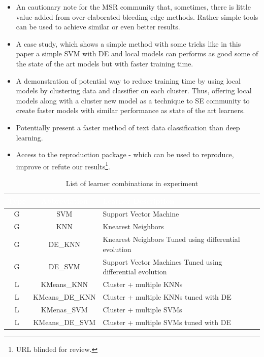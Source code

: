 \documentclass[sigconf]{acmart}
\theoremstyle{break}
\begin{document}
    \begin{itemize}
        \item An cautionary note for the MSR community
        that, sometimes, there is little value-added from
        over-elaborated bleeding edge methods. Rather simple tools  can be used to achieve similar or even better results.
        \item A case study, which shows a simple method with some tricks like in this paper a simple SVM with DE and local models can performs as good some of the state of the art models but with faster training time.
        \item A demonstration of potential way to reduce training time by using local models by clustering data and classifier on each cluster. Thus, offering local models along with a cluster new model as a technique to SE community to create faster models with similar performance as state of the art learners.
        \item Potentially present a faster method of text data classification than deep learning.
        \item Access to the reproduction package - which can be used to reproduce, improve or refute our results\footnote{URL blinded for review.}.

    \end{itemize}
    \begin{table}[!t]
        \centering
        \small
        \begin{tabular}{c|c|p{4cm}}
            \rowcolor{gray} \textcolor{white}{\textbf{Type}} & \textcolor{white}{\textbf{Abbreviation}} & \textcolor{white}{\textbf{Learner Description}}\\
            \hline
            G & SVM & Support Vector Machine \\ 
            \rowcolor{lightgray} G & KNN & K\-nearest Neighbors \\ 
            G & DE\_KNN & K\-nearest Neighbors Tuned using differential evolution \\ 
            \rowcolor{lightgray} G & DE\_SVM & Support Vector Machines Tuned using differential evolution \\ 
            L & K\-Means\_KNN & Cluster + multiple KNNs \\ 
            \rowcolor{lightgray} L & K\-Means\_DE\_KNN & Cluster + multiple KNNs tuned with DE \\ 
            L & K\-Menas\_SVM & Cluster + multiple SVMs \\ 
            \rowcolor{lightgray} L & K\-Means\_DE\_SVM & Cluster + multiple SVMs tuned with DE \\ 
        \end{tabular}
        \caption{List of learner combinations in experiment}
        \label{tab:learners}
    \end{table}
\end{document}
